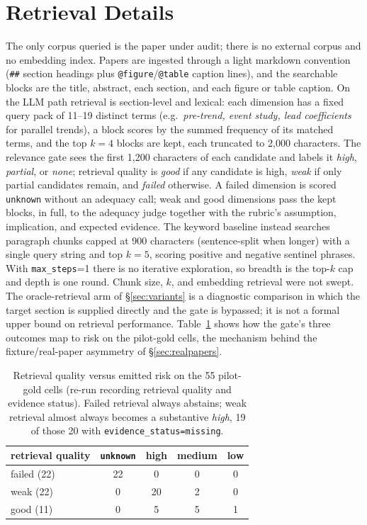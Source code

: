 \section{Retrieval Details}
\label{app:retrieval}
The only corpus queried is the paper under audit; there is no external corpus
and no embedding index. Papers are ingested through a light markdown convention
(\texttt{\#\#} section headings plus \texttt{@figure}/\texttt{@table} caption
lines), and the searchable blocks are the title, abstract, each section, and
each figure or table caption. On the LLM path retrieval is section-level and
lexical: each dimension has a fixed query pack of 11--19 distinct terms (e.g.\
\emph{pre-trend, event study, lead coefficients} for parallel trends), a block
scores by the summed frequency of its matched terms, and the top $k{=}4$ blocks
are kept, each truncated to 2,000 characters. The relevance gate sees the first
1,200 characters of each candidate and labels it \emph{high}, \emph{partial},
or \emph{none}; retrieval quality is \emph{good} if any candidate is high,
\emph{weak} if only partial candidates remain, and \emph{failed} otherwise. A
failed dimension is scored \texttt{unknown} without an adequacy call; weak and
good dimensions pass the kept blocks, in full, to the adequacy judge together
with the rubric's assumption, implication, and expected evidence. The keyword
baseline instead searches paragraph chunks capped at 900 characters
(sentence-split when longer) with a single query string and top $k{=}5$, scoring
positive and negative sentinel phrases. With \texttt{max\_steps}{=}1 there is
no iterative exploration, so breadth is the top-$k$ cap and depth is one round.
Chunk size, $k$, and embedding retrieval were not swept. The oracle-retrieval
arm of \S\ref{sec:variants} is a diagnostic comparison in which the target
section is supplied directly and the gate is bypassed; it is not a formal upper
bound on retrieval performance.
Table~\ref{tab:gate} shows how the gate's three outcomes map to risk on the
pilot-gold cells, the mechanism behind the fixture/real-paper asymmetry of
\S\ref{sec:realpapers}.

\begin{table}[t]
  \centering\small
  \caption{Retrieval quality versus emitted risk on the 55 pilot-gold cells
  (re-run recording retrieval quality and evidence status). Failed retrieval always abstains; weak retrieval almost always
  becomes a substantive \emph{high}, 19 of those 20 with
  \texttt{evidence\_status=missing}.}
  \label{tab:gate}
  \begin{tabular}{lcccc}
    \toprule
    \rowcolor{tablehead} retrieval quality & \texttt{unknown} & high & medium & low \\
    \midrule
    failed (22) & 22 & 0 & 0 & 0 \\
    weak (22)   & 0 & 20 & 2 & 0 \\
    good (11)   & 0 & 5 & 5 & 1 \\
    \bottomrule
  \end{tabular}
\end{table}

